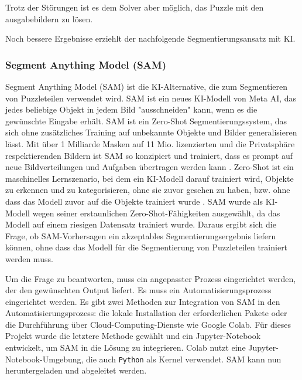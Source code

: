 Trotz der Störungen ist es dem Solver aber möglich, das Puzzle mit den ausgabebildern zu lösen.

Noch bessere Ergebnisse erziehlt der nachfolgende Segmentierungsansatz mit KI.

\subsubsection[Segment Anything Model (SAM) ]{Segment Anything Model (SAM) }

Segment Anything Model (SAM) ist die KI-Alternative, die zum Segmentieren von Puzzleteilen verwendet wird. SAM ist ein neues KI-Modell von Meta AI, das jedes beliebige Objekt in jedem Bild "ausschneiden" kann, wenn es die gewünschte Eingabe erhält. SAM ist ein Zero-Shot Segmentierungssystem, das sich ohne zusätzliches Training auf unbekannte Objekte und Bilder generalisieren lässt. Mit über 1 Milliarde Masken auf 11 Mio. lizenzierten und die Privatsphäre respektierenden Bildern ist SAM so konzipiert und trainiert, dass es prompt auf neue Bildverteilungen und Aufgaben übertragen werden kann \cite{kirillov2023segment}. Zero-Shot ist ein maschinelles Lernszenario, bei dem ein KI-Modell darauf trainiert wird, Objekte zu erkennen und zu kategorisieren, ohne sie zuvor gesehen zu haben, bzw. ohne dass das Modell zuvor auf die Objekte trainiert wurde \cite{ibm_zero_shot}. SAM wurde als KI-Modell wegen seiner erstaunlichen Zero-Shot-Fähigkeiten ausgewählt, da das Modell auf einem riesigen Datensatz trainiert wurde. Daraus ergibt sich die Frage, ob SAM-Vorhersagen ein akzeptables Segmentierungsergebnis liefern können, ohne dass das Modell für die Segmentierung von Puzzleteilen trainiert werden muss.

Um die Frage zu beantworten, muss ein angepasster Prozess eingerichtet werden, der den gewünschten Output liefert. Es muss ein Automatisierungsprozess eingerichtet werden. Es gibt zwei Methoden zur Integration von SAM in den Automatisierungsprozess: die lokale Installation der erforderlichen Pakete oder die Durchführung über Cloud-Computing-Dienste wie Google Colab. Für dieses Projekt wurde die letztere Methode gewählt und ein Jupyter-Notebook entwickelt, um SAM in die Lösung zu integrieren. Colab nutzt eine Jupyter-Notebook-Umgebung, die auch \verb|Python| als Kernel verwendet. SAM kann nun heruntergeladen und abgeleitet werden.

